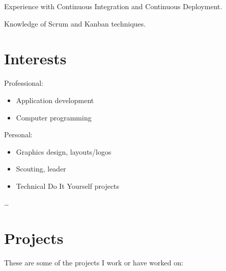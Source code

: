 \documentclass[]{friggeri-cv}
\providecommand{\tightlist}{%
\setlength{\itemsep}{0pt}\setlength{\parskip}{0pt}}
\begin{document}
Experience with Continuous Integration and Continuous Deployment.

Knowledge of Scrum and Kanban techniques.


\section{Interests}

Professional:
\begin{multicols}{2}
\begin{itemize}
  \tightlist{}
  \item Application development
  \item Computer programming
\end{itemize}
\end{multicols}


Personal:
\begin{multicols}{2}
\begin{itemize}
  \tightlist{}
  \item Graphics design, layouts/logos
  \item Scouting, leader
  \item Technical Do It Yourself projects
\end{itemize}
\end{multicols}

\ldots{}

\newpage{}


\section{Projects}

These are some of the projects I work or have worked on:
\end{document}
